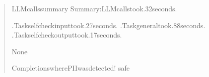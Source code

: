 \documentclass[letterpaper,11pt,english]{sphinxmanual}
\begin{document}
\begin{quote}
\begin{sphinxVerbatim}[commandchars=\\\{\}]
LLMcallssummary
\PYGZhy{}\PYGZhy{}\PYGZhy{}\PYGZhy{}\PYGZhy{}\PYGZhy{}\PYGZhy{}\PYGZhy{}\PYGZhy{}\PYGZhy{}\PYGZhy{}\PYGZhy{}\PYGZhy{}\PYGZhy{}\PYGZhy{}\PYGZhy{}\PYGZhy{}\PYGZhy{}\PYGZhy{}\PYGZhy{}\PYGZhy{}\PYGZhy{}\PYGZhy{}\PYGZhy{}\PYGZhy{}\PYGZhy{}\PYGZhy{}\PYGZhy{}\PYGZhy{}\PYGZhy{}\PYGZhy{}\PYGZhy{}\PYGZhy{}\PYGZhy{}\PYGZhy{}\PYGZhy{}\PYGZhy{}\PYGZhy{}\PYGZhy{}\PYGZhy{}
Summary:LLMcallstook.32seconds.

.Taskself\PYGZus{}check\PYGZus{}inputtook.27seconds.
.Taskgeneraltook.88seconds.
.Taskself\PYGZus{}check\PYGZus{}outputtook.17seconds.

None


CompletionswherePIIwasdetected!
\PYGZhy{}\PYGZhy{}\PYGZhy{}\PYGZhy{}\PYGZhy{}\PYGZhy{}\PYGZhy{}\PYGZhy{}\PYGZhy{}\PYGZhy{}\PYGZhy{}\PYGZhy{}\PYGZhy{}\PYGZhy{}\PYGZhy{}\PYGZhy{}\PYGZhy{}\PYGZhy{}\PYGZhy{}\PYGZhy{}\PYGZhy{}\PYGZhy{}\PYGZhy{}\PYGZhy{}\PYGZhy{}\PYGZhy{}\PYGZhy{}\PYGZhy{}\PYGZhy{}\PYGZhy{}\PYGZhy{}\PYGZhy{}\PYGZhy{}\PYGZhy{}\PYGZhy{}\PYGZhy{}\PYGZhy{}\PYGZhy{}\PYGZhy{}\PYGZhy{}
safe
\end{sphinxVerbatim}
\end{quote}
\end{document}
